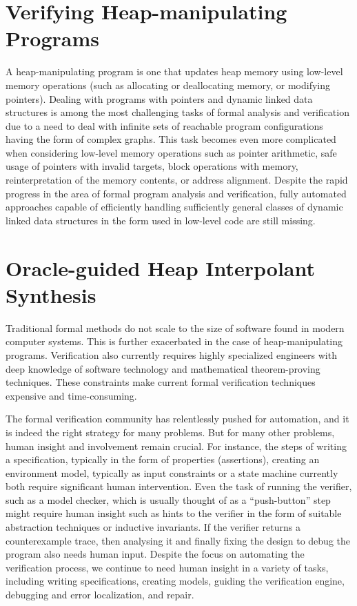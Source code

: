 \section{Verifying Heap-manipulating Programs}
A heap-manipulating program is one that updates heap memory using low-level memory operations (such as allocating or deallocating memory, or modifying pointers). Dealing with programs with pointers and dynamic linked data structures is among the most challenging tasks of formal analysis and verification due to a need to deal with infinite sets of reachable program configurations having the form of complex graphs. This task becomes even more complicated when considering low-level memory operations such as pointer arithmetic, safe usage of pointers with invalid targets, block operations with memory, reinterpretation of the memory contents, or address alignment. Despite the rapid progress in the area of formal program analysis and verification, fully automated approaches capable of efficiently handling sufficiently general classes of dynamic
linked data structures in the form used in low-level code are still missing.

\section{Oracle-guided Heap Interpolant Synthesis}
Traditional formal methods do not scale to the size of software found in modern computer systems. This is further exacerbated in the case of heap-manipulating programs. Verification also currently requires highly specialized engineers with deep knowledge of software technology and mathematical theorem-proving techniques. These constraints make current formal verification techniques expensive and time-consuming.

The formal verification community has relentlessly pushed for automation, and it is indeed the right strategy for many problems. But for many other problems, human insight and involvement remain crucial. For instance, the steps of writing a specification, typically in the form of properties (assertions), creating an environment model, typically as input constraints or a state machine currently both require significant human intervention. Even the task of running the verifier, such as a model checker, which is usually thought of as a ``push-button'' step might require human insight such as hints to the verifier in the form of suitable abstraction techniques or inductive invariants. If the verifier returns a counterexample trace, then analysing it and finally fixing the design to debug the program also needs human input. Despite the focus on automating the verification process, we continue to need human insight in a variety of tasks, including writing specifications, creating models, guiding the verification engine, debugging and error localization, and repair.

